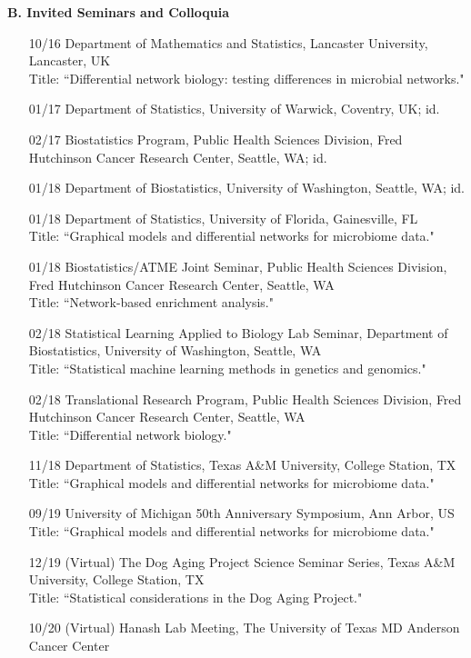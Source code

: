 \documentclass[10pt]{article}
\begin{document}
\textbf{B. Invited Seminars and Colloquia}
\begin{enumerate}\setcounter{enumi}{14}
\item[10/16] Department of Mathematics and Statistics, Lancaster University, Lancaster, UK\\
Title: {``Differential network biology: testing differences in microbial networks."}
\item[01/17] Department of Statistics, University of Warwick, Coventry, UK; id. 
\item[02/17] Biostatistics Program, Public Health Sciences Division, Fred Hutchinson Cancer Research Center, Seattle, WA; id.
\item[01/18] Department of Biostatistics, University of Washington, Seattle, WA; id.
\item[01/18] Department of Statistics, University of Florida, Gainesville, FL \\
Title: {``Graphical models and differential networks for microbiome data."} 
\item[01/18] Biostatistics/ATME Joint Seminar, Public Health Sciences Division, Fred Hutchinson Cancer Research Center, Seattle, WA\\
Title: {``Network-based enrichment analysis."} 
\item[02/18] Statistical Learning Applied to Biology Lab Seminar, Department of Biostatistics, University of Washington, Seattle, WA\\
Title: {``Statistical machine learning methods in genetics and genomics."} 
\item[02/18] Translational Research Program, Public Health Sciences Division, Fred Hutchinson Cancer Research Center, Seattle, WA\\
Title: {``Differential network biology."} 
\item[11/18] Department of Statistics, Texas A\&M University, College Station, TX\\
Title: {``Graphical models and differential networks for microbiome data."} 
\item[09/19] University of Michigan 50th Anniversary Symposium, Ann Arbor, US\\
Title: {``Graphical models and differential networks for microbiome data."} 
\item[12/19] (Virtual) The Dog Aging Project Science Seminar Series, Texas A\&M University, College Station, TX\\
Title: {``Statistical considerations in the Dog Aging Project."}
\item[10/20] (Virtual) Hanash Lab Meeting, The University of Texas MD Anderson Cancer Center\\

\end{enumerate}
\end{document}
